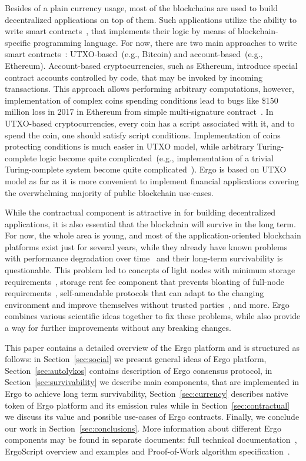 Besides of a plain currency usage, most of the blockchains are used to build decentralized applications on top of them.
Such applications utilize the ability to write smart contracts~\cite{szabo1994smart}, that implements their logic
by means of blockchain-specific programming language.
For now, there are two main approaches to write smart contracts~\cite{zahnentferner2018chimeric}:
UTXO-based~(e.g., Bitcoin) and account-based~(e.g., Ethereum).
Account-based cryptocurrencies, such as Ethereum, introduce special contract accounts controlled by code,
that may be invoked by incoming transactions.
This approach allows performing arbitrary computations, however, implementation of complex coins spending conditions
lead to bugs like \$150 million loss in 2017 in
Ethereum from simple multi-signature contract~\cite{parityLock}.
In UTXO-based cryptocurrencies, every coin has a script associated with it, and to spend the coin, one should
satisfy script conditions.
Implementation of coins protecting conditions is much easier in UTXO model,
while arbitrary Turing-complete logic become quite complicated~(e.g., implementation of a trivial Turing-complete
system become quite complicated~\cite{chepurnoy2018self}).
Ergo is based on UTXO model as far as it is more convenient to implement financial applications covering the
overwhelming majority of public blockchain use-cases.

While the contractual component is attractive in for building decentralized applications,
it is also essential that the blockchain will survive in the long term.
For now, the whole area is young, and most of the application-oriented blockchain platforms exist just for several years,
while they already have known problems with performance degradation over time~\cite{???} and their long-term survivability is questionable.
This problem led to concepts of light nodes with minimum storage requirements~\cite{reyzin2017improving},
storage rent fee component that prevents bloating of full-node requirements~\cite{chepurnoy2018systematic},
self-amendable protocols that can adapt to the changing environment and improve themselves without
trusted parties~\cite{goodman2014tezos}, and more.
Ergo combines various scientific ideas together to fix these problems, while also provide a way for
further improvements without any breaking changes.

This paper contains a detailed overview of the Ergo platform %
and is structured as follows: in Section~\ref{sec:social} we present general ideas of Ergo platform,
Section~\ref{sec:autolykos} contains description of Ergo consensus protocol,
in Section~\ref{sec:survivability} we describe main components, that are implemented in Ergo
to achieve long term survivability, Section~\ref{sec:currency} describes native token
of Ergo platform and its emission rules while in Section~\ref{sec:contractual} we
discuss its value and possible use-cases of Ergo contracts.
Finally, we conclude our work in Section~\ref{sec:conclusions}.
More information about different Ergo components may be found in separate documents:
full technical documentation~\cite{yellowpaper}, ErgoScript overview and examples\cite{???,???} and
Proof-of-Work algorithm specification~\cite{Ergopow}.
